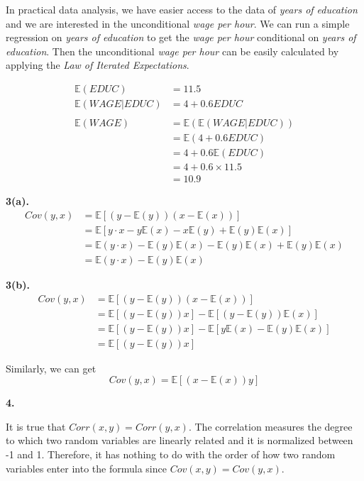 \documentclass[UTF8]{ctexart}
\begin{document}
In practical data analysis, we have easier access to the data of \textit{years of education} and 
we are interested in the unconditional \textit{wage per hour}. We can run a simple regression on 
\textit{years of education} to get the \textit{wage per hour} conditional on \textit{years of education}. 
Then the unconditional \textit{wage per hour} can be easily calculated by applying the \textit{Law of Iterated Expectations}.

\begin{align*}
    \mathbb{E}(EDUC)&=11.5 \\
    \mathbb{E}(WAGE|EDUC)&=4 + 0.6 EDUC \\
    \\
    \mathbb{E}(WAGE)&=\mathbb{E}(\mathbb{E}(WAGE|EDUC)) \\
    &=\mathbb{E}(4 + 0.6 EDUC) \\
    &=4+0.6\mathbb{E}(EDUC) \\
    &=4+0.6 \times 11.5 \\
    &=10.9
\end{align*}
\par 

\textbf{3(a).}
\begin{align*}
    Cov(y,x)&=\mathbb{E}[(y-\mathbb{E}(y))(x-\mathbb{E}(x))] \\
    &=\mathbb{E}[y \cdot x-y\mathbb{E}(x)-x\mathbb{E}(y)+\mathbb{E}(y)\mathbb{E}(x)] \\
    &=\mathbb{E}(y \cdot x)-\mathbb{E}(y)\mathbb{E}(x)-\mathbb{E}(y)\mathbb{E}(x)+\mathbb{E}(y)\mathbb{E}(x) \\
    &=\mathbb{E}(y \cdot x)-\mathbb{E}(y)\mathbb{E}(x)
\end{align*}

\textbf{3(b).}
\begin{align*}
    Cov(y,x)&=\mathbb{E}[(y-\mathbb{E}(y))(x-\mathbb{E}(x))] \\
    &=\mathbb{E}[(y-\mathbb{E}(y))x]-\mathbb{E}[(y-\mathbb{E}(y))\mathbb{E}(x)] \\
    &=\mathbb{E}[(y-\mathbb{E}(y))x]-\mathbb{E}[y\mathbb{E}(x)-\mathbb{E}(y)\mathbb{E}(x)] \\
    &=\mathbb{E}[(y-\mathbb{E}(y))x]
\end{align*}

Similarly, we can get
\[Cov(y,x)=\mathbb{E}[(x-\mathbb{E}(x))y] \]
\par 

\textbf{4.}

It is true that $Corr(x,y)=Corr(y,x)$. The correlation measures the degree to which two random variables 
are linearly related and it is normalized between -1 and 1. Therefore, it has nothing to do with the order 
of how two random variables enter into the formula since $Cov(x,y)=Cov(y,x)$.
\end{document}
